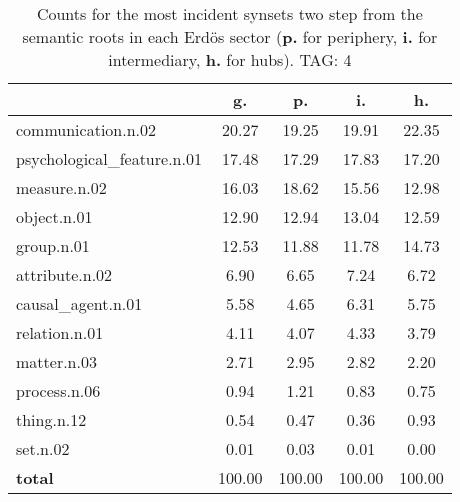 \begin{table}[h!]
\begin{center}
\begin{tabular}{| l || c | c | c | c |}\hline
 & {\bf g.} & {\bf p.} & {\bf i.} & {\bf h.} \\\hline\hline
communication.n.02 & 20.27  & 19.25  & 19.91  & 22.35 \\\hline
psychological\_feature.n.01 & 17.48  & 17.29  & 17.83  & 17.20 \\\hline
measure.n.02 & 16.03  & 18.62  & 15.56  & 12.98 \\\hline
object.n.01 & 12.90  & 12.94  & 13.04  & 12.59 \\\hline
group.n.01 & 12.53  & 11.88  & 11.78  & 14.73 \\\hline
attribute.n.02 & 6.90  & 6.65  & 7.24  & 6.72 \\\hline
causal\_agent.n.01 & 5.58  & 4.65  & 6.31  & 5.75 \\\hline
relation.n.01 & 4.11  & 4.07  & 4.33  & 3.79 \\\hline
matter.n.03 & 2.71  & 2.95  & 2.82  & 2.20 \\\hline
process.n.06 & 0.94  & 1.21  & 0.83  & 0.75 \\\hline
thing.n.12 & 0.54  & 0.47  & 0.36  & 0.93 \\\hline
set.n.02 & 0.01  & 0.03  & 0.01  & 0.00 \\\hline\hline
{{\bf total}} & 100.00  & 100.00  & 100.00  & 100.00 \\\hline
\end{tabular}
\caption{Counts for the most incident synsets two step from the semantic roots in each Erd\"os sector ({\bf p.} for periphery, {\bf i.} for intermediary, {\bf h.} for hubs). TAG: 4}
\end{center}
\end{table}